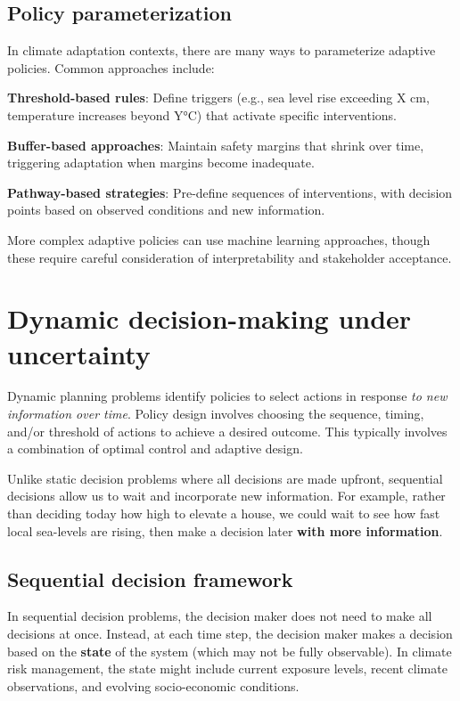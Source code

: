 \documentclass[
  letterpaper,
  DIV=11,
  numbers=noendperiod]{scrreprt}
\begin{document}
\subsection{Policy parameterization}\label{policy-parameterization}

In climate adaptation contexts, there are many ways to parameterize
adaptive policies. Common approaches include:

\textbf{Threshold-based rules}: Define triggers (e.g., sea level rise
exceeding X cm, temperature increases beyond Y°C) that activate specific
interventions.

\textbf{Buffer-based approaches}: Maintain safety margins that shrink
over time, triggering adaptation when margins become inadequate.

\textbf{Pathway-based strategies}: Pre-define sequences of
interventions, with decision points based on observed conditions and new
information.

More complex adaptive policies can use machine learning approaches,
though these require careful consideration of interpretability and
stakeholder acceptance.

\section{Dynamic decision-making under
uncertainty}\label{dynamic-decision-making-under-uncertainty}

Dynamic planning problems identify policies to select actions in
response \emph{to new information over time}. Policy design involves
choosing the sequence, timing, and/or threshold of actions to achieve a
desired outcome. This typically involves a combination of optimal
control and adaptive design.

Unlike static decision problems where all decisions are made upfront,
sequential decisions allow us to wait and incorporate new information.
For example, rather than deciding today how high to elevate a house, we
could wait to see how fast local sea-levels are rising, then make a
decision later \textbf{with more information}.

\subsection{Sequential decision
framework}\label{sequential-decision-framework}

In sequential decision problems, the decision maker does not need to
make all decisions at once. Instead, at each time step, the decision
maker makes a decision based on the \textbf{state} of the system (which
may not be fully observable). In climate risk management, the state
might include current exposure levels, recent climate observations, and
evolving socio-economic conditions.
\end{document}
